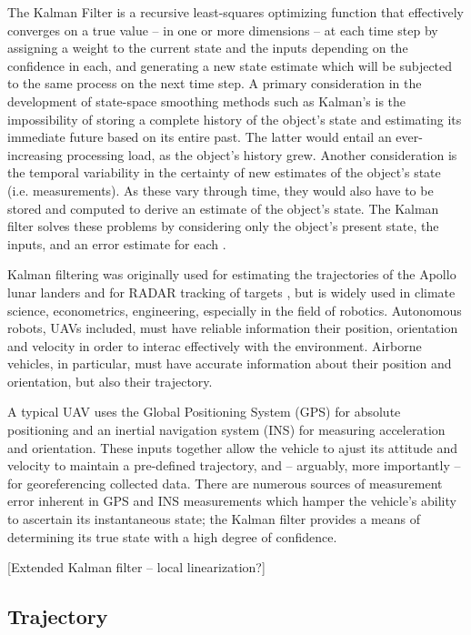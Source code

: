\documentclass[10pt,a4paper]{report}
\begin{document}
The Kalman Filter \cite{Kalman1960} is a recursive least-squares optimizing function that effectively converges on a true value -- in one or more dimensions -- at each time step by assigning a weight to the current state and the inputs depending on the confidence in each, and generating a new state estimate which will be subjected to the same process on the next time step. A primary consideration in the development of state-space smoothing methods such as Kalman's is the impossibility of storing a complete history of the object's state and estimating its immediate future based on its entire past. The latter would entail an ever-increasing processing load, as the object's history grew. Another consideration is the temporal variability in the certainty of new estimates of the object's state (i.e. measurements). As these vary through time, they would also have to be stored and computed to derive an estimate of the object's state. The Kalman filter solves these problems by considering only the object's present state, the inputs, and an error estimate for each \cite{Swerling1959}. 

Kalman filtering was originally used for estimating the trajectories of the Apollo lunar landers and for RADAR tracking of targets \cite{Grewal2010}, but is widely used in climate science, econometrics, engineering, especially in the field of robotics. Autonomous robots, UAVs included, must have reliable information their position, orientation and velocity in order to interac effectively with the environment. Airborne vehicles, in particular, must have accurate information about their position and orientation, but also their trajectory.

A typical UAV uses the Global Positioning System (GPS) for absolute positioning and an inertial navigation system (INS) for measuring acceleration and orientation. These inputs together allow the vehicle to ajust its attitude and velocity to maintain a pre-defined trajectory, and -- arguably, more importantly -- for georeferencing collected data. There are numerous sources of measurement error inherent in GPS and INS measurements which hamper the vehicle's ability to ascertain its instantaneous state; the Kalman filter provides a means of determining its true state with a high degree of confidence.

[Extended Kalman filter -- local linearization?]

\subsection{Trajectory}
\end{document}
